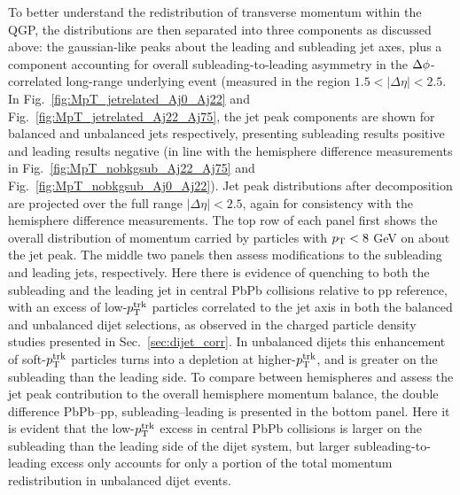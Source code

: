 To better understand the redistribution of transverse momentum within the QGP, the distributions are then separated into three components as discussed above:  the gaussian-like peaks about the leading and subleading jet axes, plus a component accounting for overall subleading-to-leading asymmetry in the $\protect\Delta\phi$-correlated long-range underlying event (measured in the region $1.5<|\Delta\eta|<2.5$.  In Fig.~\ref{fig:MpT_jetrelated_Aj0_Aj22} and Fig.~\ref{fig:MpT_jetrelated_Aj22_Aj75}, the jet peak components are shown for balanced and unbalanced jets respectively, presenting subleading results positive and leading results negative (in line with the hemisphere difference measurements in Fig.~\ref{fig:MpT_nobkgsub_Aj22_Aj75} and Fig.~\ref{fig:MpT_nobkgsub_Aj0_Aj22}).  Jet peak distributions after decomposition are projected over the full range $|\Delta\eta|<2.5$, again for consistency with the hemisphere difference measurements.  The top row of each panel first shows the overall distribution of momentum carried by particles with $p_{\rm T} < 8$ GeV on about the jet peak.  The middle two panels then assess modifications to the subleading and leading jets, respectively.  Here there is evidence of quenching to both the subleading and the leading jet in central PbPb collisions relative to pp reference, with an excess of low-$p_{\rm T}^{\rm trk}$ particles correlated to the jet axis in both the balanced and unbalanced dijet selections, as observed in the charged particle density studies presented in Sec.~\ref{sec:dijet_corr}.  In unbalanced dijets this enhancement of soft-$p_{\rm T}^{\rm trk}$ particles turns into a depletion at higher-$p_{\rm T}^{\rm trk}$, and is greater on the subleading than the leading side.  To compare between hemispheres and assess the jet peak contribution to the overall hemisphere momentum balance, the double difference PbPb--pp, subleading--leading is presented in the bottom panel.  Here it is evident that the low-$p_{\rm T}^{\rm trk}$ excess in central PbPb collisions is larger on the subleading than the leading side of the dijet system, but larger subleading-to-leading excess only accounts for only a portion of the total momentum redistribution in unbalanced dijet events.


